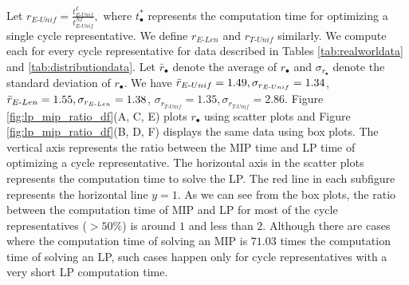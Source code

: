 \documentclass[11pt,onecolumn]{article}
\newcommand{\fig}{Figure }
\newcommand{\NI}{^{NI}}
\newcommand{\I}{^I}
\newcommand{\EU}{_{E\text{-}Unif}}
\newcommand{\EL}{_{E\text{-}Len}}
\newcommand{\TU}{_{T\text{-}Unif}}
\theoremstyle{plain}
\theoremstyle{definition}
\begin{document}
Let $r\EU = \frac{t\I\EU}{t\NI\EU},$ where $t^*_\bullet$ represents the computation time for optimizing a single cycle representative. We define $r\EL$ and $r\TU$ similarly. We compute each for every cycle representative for data described in Tables \ref{tab:realworldata} and \ref{tab:distributiondata}. Let $\bar{r}_\bullet$ denote the average of $r_\bullet$ and $\sigma_{r_\bullet}$ denote the standard deviation of $r_\bullet$. We have $\Bar{r}\EU = 1.49, \sigma_{r\EU} = 1.34$, $\Bar{r}\EL = 1.55,  \sigma_{r\EL} = 1.38$, $ \sigma_{r\TU} = 1.35, \sigma_{r\TU} = 2.86$. \fig \ref{fig:lp_mip_ratio_df}(A, C, E) plots $r_\bullet$ using scatter plots and \fig \ref{fig:lp_mip_ratio_df}(B, D, F) displays the same data using box plots. The vertical axis represents the ratio between the MIP time and LP time of optimizing a cycle representative. The horizontal axis in the scatter plots represents the computation time to solve the LP. The red line in each subfigure represents the horizontal line $y=1$. As we can see from the box plots, the ratio between the computation time of MIP and LP for most of the cycle representatives ($>50\%$) is around $1$ and less than $2$. Although there are cases where the computation time of solving an MIP is $71.03$ times the computation time of solving an LP, such cases happen only for cycle representatives with a very short LP computation time.  
\end{document}
